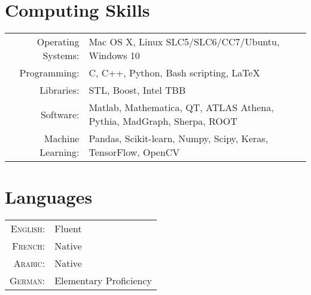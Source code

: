 \documentclass[a4paper,10pt]{article}
\begin{document}
\vspace{3mm}
\section{Computing Skills}
\begin{tabular}{rl}
Operating Systems:  & Mac OS X, Linux SLC5/SLC6/CC7/Ubuntu, Windows 10  \\
Programming:    & C, C++, Python, Bash scripting, \LaTeX        \\
Libraries:          & STL, Boost, Intel TBB \\
Software:           & Matlab, Mathematica, QT, ATLAS Athena, Pythia, MadGraph, Sherpa, ROOT   \\
Machine Learning:   & Pandas, Scikit-learn, Numpy, Scipy, Keras, TensorFlow, OpenCV     \\
\end{tabular}


\vspace{3mm}
\section{Languages}

\begin{tabular}{rl}
\textsc{English:}	& Fluent					\\
\textsc{French:}	& Native	\\
\textsc{Arabic:}	& Native    \\
\textsc{German:}	& Elementary Proficiency		\\
\end{tabular}
\end{document}
